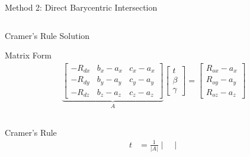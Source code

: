 \begin{frame}{Method 2: Direct Barycentric Intersection}
\begin{columns}
\begin{column}{0.35\textwidth}
        \end{column}
    \end{columns}
\end{frame}

\begin{frame}{Cramer's Rule Solution}
    \begin{mathbox}{Matrix Form}
        \vspace{-0.5cm}
        \small
        \begin{align*}
            \underbrace{
                \begin{bmatrix}
                    -R_{dx} & b_x-a_x & c_x-a_x \\
                    -R_{dy} & b_y-a_y & c_y-a_y \\
                    -R_{dz} & b_z-a_z & c_z-a_z
                \end{bmatrix}
            }_{A}
            \begin{bmatrix}
                t \\ \beta \\ \gamma
            \end{bmatrix}
            =
            \begin{bmatrix}
                R_{ox} - a_x \\
                R_{oy} - a_y \\
                R_{oz} - a_z
            \end{bmatrix}
        \end{align*}
    \end{mathbox}
    \vspace{-0.1cm}
    \pause
    \begin{columns}
        \begin{column}{0.6\textwidth}
            \begin{mathbox}{Cramer's Rule}
                \vspace{-0.3cm}
                \footnotesize
                \begin{align*}
                    t &= \frac{1}{|A|} \begin{vmatrix}

\end{vmatrix}
\end{align*}
\end{mathbox}
\end{column}
\end{columns}
\end{frame}
